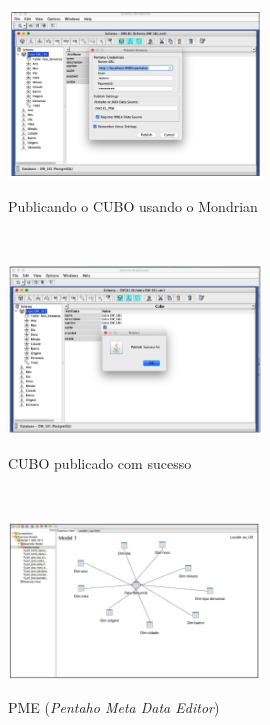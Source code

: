 \begin{figure}[H]
	\vspace*{0,2cm}
    \centering
    \caption{Publicando o CUBO usando o Mondrian}
    \includegraphics[width=0.6\textwidth]{./04-figuras/figura-pentaho-psw-publicando}
    \label{fig:ilustfigpentahopswpublicando}
\end{figure}
\vspace*{-0,9cm}
{\raggedright {}} \\

\begin{figure}[H]
	\vspace*{0,2cm}
    \centering
    \caption{CUBO publicado com sucesso}
    \includegraphics[width=0.6\textwidth]{./04-figuras/figura-pentaho-psw-publicado-sucesso}
    \label{fig:ilustfigpentahopswpublicadosucesso}
\end{figure}
\vspace*{-0,9cm}
{\raggedright {}} \\

\begin{figure}[H]
	\vspace*{0,2cm}
    \centering
    \caption{PME (\textit{Pentaho Meta Data Editor})}
    \includegraphics[width=0.6\textwidth]{./04-figuras/figura-pentaho-pme}
    \label{fig:ilustfigpentahopentahopme}
\end{figure}
\vspace*{-0,9cm}
{\raggedright {}} \\

